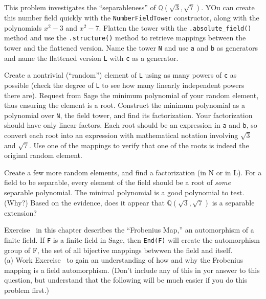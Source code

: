 \begin{sageverbatim}\end{sageverbatim}
%
%
This problem investigates the ``separableness'' of ${\mathbb Q}(\sqrt{3},\sqrt{7})$.  YOu can create this number field quickly with the \verb?NumberFieldTower? constructor, along with the polynomials $x^2-3$ and $x^2-7$.  Flatten the tower with the \verb?.absolute_field()? method and use the \verb?.structure()? method to retrieve mappings between the tower and the flattened version.  Name the tower \verb?N? and use \verb?a? and \verb?b? as generators and name the flattened version \verb?L? with \verb?c? as a generator.\par
%
Create a nontrivial (``random'') element of \verb?L? using as many powers of \verb?c? as possible (check the degree of \verb?L? to see how many linearly independent powers there are).  Request from Sage the minimum polynomial of your random element, thus ensuring the element is a root.  Construct the minimum polynomial as a polynomial over \verb?N?, the field tower, and find its factorization.  Your factorization should have only linear factors.  Each root should be an expression in \verb?a? and \verb?b?, so convert each root into an expression with mathematical notation involving $\sqrt{3}$ and $\sqrt{7}$.  Use one of the mappings to verify that one of the roots is indeed the original random element.\par
%
Create a few more random elements, and find a factorization (in N or in L).  For a field to be separable, every element of the field should be a root of \emph{some} separable polynomial.  The minimal polynomial is a good polynomial to test.  (Why?)  Based on the evidence, does it appear that ${\mathbb Q}(\sqrt{3},\sqrt{7})$ is a separable extension?
\begin{sageverbatim}\end{sageverbatim}
%
%
Exercise~ in this chapter describes the ``Frobenius Map,'' an automorphism of a finite field.  If \texttt{F} is a finite field in Sage, then \texttt{End(F)} will create the automorphism group of F, the set of all bijective mappings betwwen the field and itself.\\
%
(a)  Work Exercise~ to gain an understanding of how and why the Frobenius mapping is a field automorphism.  (Don't include any of this in yor answer to this question, but understand that the following will be much easier if you do this problem first.)\\
